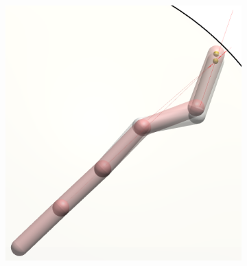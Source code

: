 \begin{figure}[h]
\begin{subfigure}[b]{.35\textwidth}
        \includegraphics[width=\textwidth]{Figures/arm-full-sphere.png}
    \end{subfigure}
    \label{fig:fullSphere}
    
    \vspace{1em}
    

\end{figure}
